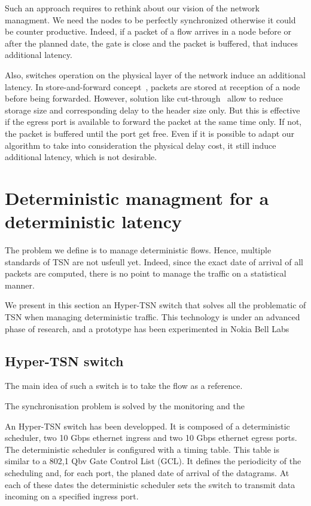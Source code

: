 Such an approach requires to rethink about our vision of the network managment. We need the nodes to be perfectly synchronized otherwise it could be counter productive. Indeed, if a packet of a flow arrives in a node before or after the planned date, the gate is close and the packet is buffered, that induces additional latency.

Also, switches operation on the physical layer of the network induce an additional latency. In store-and-forward concept~\cite{tindell1992store}, packets are stored at reception of a node before being forwarded. However, solution like cut-through~\cite{kermani1979virtual} allow to reduce storage size and corresponding delay to the header size only. But this is effective if the egress port is available to forward the packet at the same time only. If not, the packet is buffered until the port get free. Even if it is possible to adapt our algorithm to take into consideration the physical delay cost, it still induce additional latency, which is not desirable.


\section{Deterministic managment for a deterministic latency}
\label{sec:platform}

The problem we define is to manage deterministic flows. Hence, multiple standards of TSN are not usfeull yet. Indeed, since the exact date of arrival of all packets are computed, there is no point to manage the traffic on a statistical manner. 

We present in this section an Hyper-TSN switch that solves all the problematic of TSN when managing deterministic traffic.
This technology is under an advanced phase of research, and a prototype has been experimented in Nokia Bell Labs


\subsection{Hyper-TSN switch}


The main idea of such a switch is to take the flow as a reference. 

The synchronisation problem is solved by the monitoring and the


An Hyper-TSN switch has been developped. It is composed of a deterministic scheduler, two 10 Gbps ethernet ingress and two 10 Gbps ethernet egress ports. The deterministic scheduler is configured with a timing table. This table is similar to a 802,1 Qbv Gate Control List (GCL). It defines the periodicity of the scheduling and, for each port, the planed date of arrival of the datagrams. At each of these dates the deterministic scheduler sets the switch to transmit data incoming on a specified ingress port.

